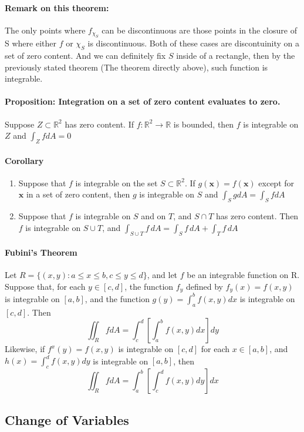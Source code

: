 \documentclass[11pt]{article}
\newcommand{\bx}[0]{\mathbf{x}}
\newcommand{\real}[0]{\mathbb{R}}
\begin{document}
\paragraph{Remark on this theorem:} The only points where $f_{\chi_S}$ can be discontinuous are those points in the closure of S where either $f$ or $\chi_S$ is discontinuous. Both of these cases are discontuinity on a set of zero content. And we can definitely fix $S$ inside of a rectangle, then by the previously stated theorem (The theorem directly above), such function is integrable.

\paragraph{Proposition: Integration on a set of zero content evaluates to zero.} Suppose $Z\subset \real^2$ has zero content. If $f:\real^2\rightarrow{} \real$ is bounded, then $f$ is integrable on $Z$ and $\int_Z fdA = 0$

\paragraph{Corollary}
\begin{enumerate}
    \item Suppose that $f$ is integrable on the set $S\subset \real^2$. If $g(\bx) = f(\bx)$ except for $\bx$ in a set of zero content, then $g$ is integrable on $S$ and $\int_S gdA = \int_S fdA$
    \item Suppose that $f$ is integrable on $S$ and on $T$, and $S\cap T$ has zero content. Then $f$ is integrable on $S\cup T$, and $\int_{S\cup T}f\,dA = \int_Sf\,dA+ \int_Tf\,dA$
\end{enumerate}
\paragraph{Fubini's Theorem} Let $R = \{(x,y): a\leq x\leq b, c \leq y \leq d \}$, and let $f$ be an integrable function on R. Suppose that, for each $y \in [c, d]$, the function $f_y$ defined by $f_y(x) = f(x, y)$ is integrable on $[a,b]$, and the function $g(y) = \int_a^bf(x,y)dx$ is integrable on $[c,d]$. Then
$$\iint_R fdA = \int_c^d\left[\int_a^b f(x,y)dx\right]dy$$
Likewise, if $f^x(y) = f(x,y)$ is integrable on $[c,d]$ for each $x \in [a,b]$, and $h(x) = \int_c^df(x,y)dy$ is integrable on $[a,b]$, then
$$\iint_R fdA = \int_a^b\left[\int_c^d f(x,y)dy\right]dx$$

\subsection{Change of Variables}
\end{document}
